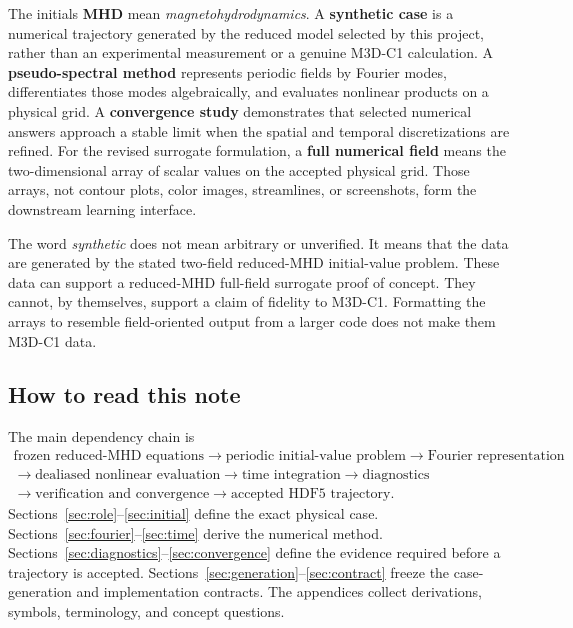 \documentclass[11pt]{article}
\begin{document}
The initials \textbf{MHD} mean \emph{magnetohydrodynamics}. A \textbf{synthetic case} is a numerical trajectory generated by the reduced model selected by this project, rather than an experimental measurement or a genuine M3D-C1 calculation. A \textbf{pseudo-spectral method} represents periodic fields by Fourier modes, differentiates those modes algebraically, and evaluates nonlinear products on a physical grid. A \textbf{convergence study} demonstrates that selected numerical answers approach a stable limit when the spatial and temporal discretizations are refined. For the revised surrogate formulation, a \textbf{full numerical field} means the two-dimensional array of scalar values on the accepted physical grid. Those arrays, not contour plots, color images, streamlines, or screenshots, form the downstream learning interface.

\begin{warningbox}
The word \emph{synthetic} does not mean arbitrary or unverified. It means that the data are generated by the stated two-field reduced-MHD initial-value problem. These data can support a reduced-MHD full-field surrogate proof of concept. They cannot, by themselves, support a claim of fidelity to M3D-C1. Formatting the arrays to resemble field-oriented output from a larger code does not make them M3D-C1 data.
\end{warningbox}

\subsection*{How to read this note}

The main dependency chain is
\[
\begin{gathered}
\text{frozen reduced-MHD equations}
\longrightarrow \text{periodic initial-value problem}
\longrightarrow \text{Fourier representation}\\
\longrightarrow \text{dealiased nonlinear evaluation}
\longrightarrow \text{time integration}
\longrightarrow \text{diagnostics}\\
\longrightarrow \text{verification and convergence}
\longrightarrow \text{accepted HDF5 trajectory}.
\end{gathered}
\]
Sections~\ref{sec:role}--\ref{sec:initial} define the exact physical case. Sections~\ref{sec:fourier}--\ref{sec:time} derive the numerical method. Sections~\ref{sec:diagnostics}--\ref{sec:convergence} define the evidence required before a trajectory is accepted. Sections~\ref{sec:generation}--\ref{sec:contract} freeze the case-generation and implementation contracts. The appendices collect derivations, symbols, terminology, and concept questions.
\end{document}
